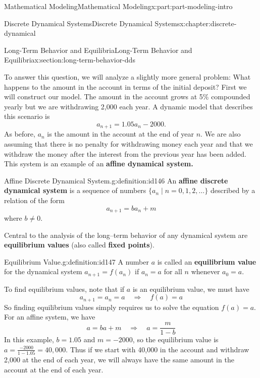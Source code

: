 \documentclass[oneside,10pt,]{book}
\newcommand{\terminology}[1]{\textbf{#1}}
\numberwithin{equation}{section}
\begin{document}
\begin{partptx}{Mathematical Modeling}{}{Mathematical Modeling}{}{}{x:part:part-modeling-intro}
\begin{chapterptx}{Discrete Dynamical Systems}{}{Discrete Dynamical Systems}{}{}{x:chapter:discrete-dynamical}
\begin{sectionptx}{Long-Term Behavior and Equilibria}{}{Long-Term Behavior and Equilibria}{}{}{x:section:long-term-behavior-dds}
\par
To answer this question, we will analyze a slightly more general problem: What happens to the amount in the account in terms of the initial deposit? First we will construct our model. The amount in the account grows at 5\% compounded yearly but we are withdrawing \textdollar{}2,000 each year. A dynamic model that describes this scenario is%
%
\begin{equation*}
a_{n+1} = 1.05 a_n - 2000. 
\end{equation*}
As before, \(a_n\) is the amount in the account at the end of year \(n\). We are also assuming that there is no penalty for withdrawing money each year and that we withdraw the money after the interest from the previous year has been added. This system is an example of an \terminology{affine dynamical system.}%
\begin{definition}{Affine Discrete Dynamical System.}{g:definition:id146}%
An \terminology{affine discrete dynamical system} is a sequence of numbers \(\{a_n\mid n = 0, 1, 2, \dots\}\) described by a relation of the form%
%
\begin{equation*}
a_{n+1} = ba_n + m 
\end{equation*}
where \(b\ne 0\).%
\end{definition}
Central to the analysis of the long–term behavior of any dynamical system are \terminology{equilibrium values} (also called \terminology{fixed points}).%
\begin{definition}{Equilibrium Value.}{g:definition:id147}%
A number \(a\) is called an \terminology{equilibrium value} for the dynamical system \(a_{n+1} = f(a_n)\) if \(a_n = a\) for all \(n\) whenever \(a_0 = a\).%
\end{definition}
To find equilibrium values, note that if \(a\) is an equilibrium value, we must have%
%
\begin{equation*}
a_{n+1} = a_n = a \quad\Rightarrow \quad f(a) = a 
\end{equation*}
So finding equilibrium values simply requires us to solve the equation \(f(a) = a\). For an affine system, we have%
%
\begin{equation*}
a = ba+m \quad\Rightarrow \quad a = \frac{m}{1-b} 
\end{equation*}
In this example, \(b=1.05\) and \(m=-2000\), so the equilibrium value is \(a=\frac{-2000}{1-1.05} = 40,000\). Thus if we start with \textdollar{}40,000 in the account and withdraw \textdollar{}2,000 at the end of each year, we will always have the same amount in the account at the end of each year.%

\end{sectionptx}
\end{chapterptx}
\end{partptx}
\end{document}
